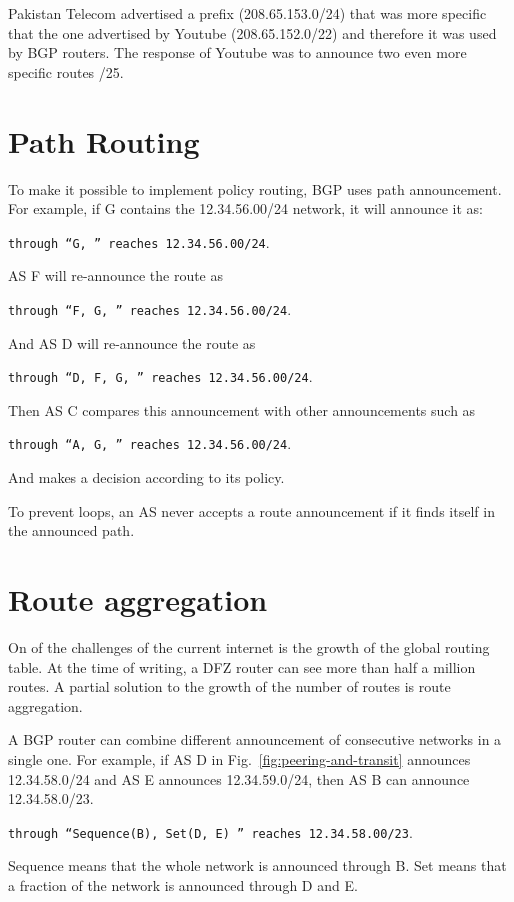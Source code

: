 Pakistan Telecom advertised a prefix (208.65.153.0/24) that was more specific that the one advertised by Youtube (208.65.152.0/22) and therefore it was used by BGP routers.
The response of Youtube was to announce two even more specific routes /25.

\section{Path Routing}

To make it possible to implement policy routing, BGP uses path announcement. 
For example, if G contains the 12.34.56.00/24 network, it will announce it as:

\texttt{through ``G, '' reaches 12.34.56.00/24}.

AS F will re-announce the route as 

\texttt{through ``F, G, '' reaches 12.34.56.00/24}.

And AS D will re-announce the route as 

\texttt{through ``D, F, G, '' reaches 12.34.56.00/24}.

Then AS C compares this announcement with other announcements such as 

\texttt{through ``A, G, '' reaches 12.34.56.00/24}.

And makes a decision according to its policy.

To prevent loops, an AS never accepts a route announcement if it finds itself in the announced path.

\section{Route aggregation}

On of the challenges of the current internet is the growth of the global routing table.
At the time of writing, a DFZ router can see more than half a million routes.
A partial solution to the growth of the number of routes is route aggregation.

A BGP router can combine different announcement of consecutive networks in a single one.
For example, if AS D in Fig.~\ref{fig:peering-and-transit} announces 12.34.58.0/24 and AS E announces 12.34.59.0/24, then AS B can announce 12.34.58.0/23.

\texttt{through ``Sequence(B), Set(D, E) '' reaches 12.34.58.00/23}.

Sequence means that the whole network is announced through B.
Set means that a fraction of the network is announced through D and E.

